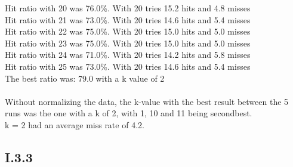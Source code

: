 \documentclass{article}
\begin{document}
Hit ratio with 20 was  76.0\%. With 20 tries 15.2 hits and 4.8 misses\\
Hit ratio with 21 was  73.0\%. With 20 tries 14.6 hits and 5.4 misses\\
Hit ratio with 22 was  75.0\%. With 20 tries 15.0 hits and 5.0 misses\\
Hit ratio with 23 was  75.0\%. With 20 tries 15.0 hits and 5.0 misses\\
Hit ratio with 24 was  71.0\%. With 20 tries 14.2 hits and 5.8 misses\\
Hit ratio with 25 was  73.0\%. With 20 tries 14.6 hits and 5.4 misses\\
The best ratio was: 79.0 with a k value of 2\\\\
Without normalizing the data, the k-value with the best result between the 5 runs was the one with a k of 2, with 1, 10 and 11 being secondbest.\\
k = 2 had an average miss rate of 4.2.

\subsection{I.3.3}
\end{document}
